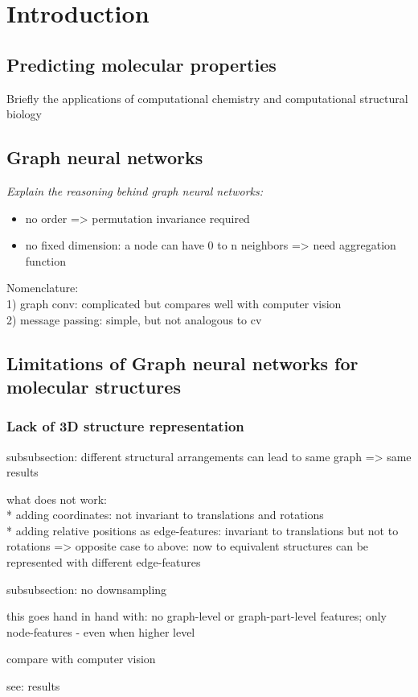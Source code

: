 \chapter{Introduction}
\label{chapter:Introduction}

\section{Predicting molecular properties}

\textit{} Briefly the applications of computational chemistry and computational structural biology

\section{Graph neural networks}

{\itshape
\noindent Explain the reasoning behind graph neural networks:

\begin{itemize}
	\item no order => permutation invariance required
	\item no fixed dimension: a node can have 0 to n neighbors => need aggregation function
\end{itemize}

\noindent Nomenclature:\\
1) graph conv: complicated but compares well with computer vision\\
2) message passing: simple, but not analogous to cv
}

\section{Limitations of Graph neural networks for molecular structures}

\subsection{Lack of 3D structure representation}

{\itshape
	
subsubsection: different structural arrangements can lead to same graph => same results

what does not work:\\
* adding coordinates: not invariant to translations and rotations\\
* adding relative positions as edge-features: invariant to translations but not to rotations
=> opposite case to above: now to equivalent structures can be represented with different edge-features

subsubsection: no downsampling

this goes hand in hand with: no graph-level or graph-part-level features; only node-features - even when higher level

compare with computer vision

see: results
	}
	
	


